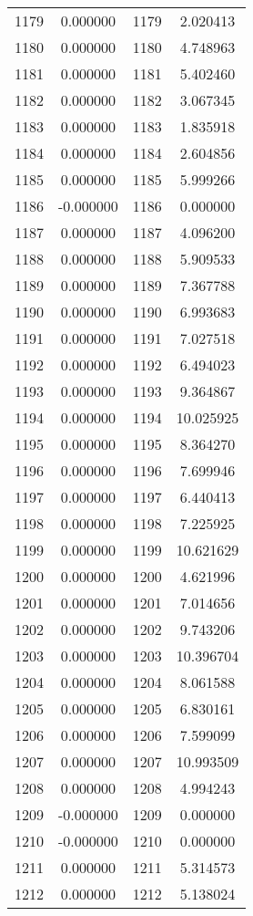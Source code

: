 \documentclass[12pt]{article}
\begin{document}
\begin{longtable}{@{}cccc@{}}
1179 & 0.000000 & 1179 & 2.020413 \\
1180 & 0.000000 & 1180 & 4.748963 \\
1181 & 0.000000 & 1181 & 5.402460 \\
1182 & 0.000000 & 1182 & 3.067345 \\
1183 & 0.000000 & 1183 & 1.835918 \\
1184 & 0.000000 & 1184 & 2.604856 \\
1185 & 0.000000 & 1185 & 5.999266 \\
1186 & -0.000000 & 1186 & 0.000000 \\
1187 & 0.000000 & 1187 & 4.096200 \\
1188 & 0.000000 & 1188 & 5.909533 \\
1189 & 0.000000 & 1189 & 7.367788 \\
1190 & 0.000000 & 1190 & 6.993683 \\
1191 & 0.000000 & 1191 & 7.027518 \\
1192 & 0.000000 & 1192 & 6.494023 \\
1193 & 0.000000 & 1193 & 9.364867 \\
1194 & 0.000000 & 1194 & 10.025925 \\
1195 & 0.000000 & 1195 & 8.364270 \\
1196 & 0.000000 & 1196 & 7.699946 \\
1197 & 0.000000 & 1197 & 6.440413 \\
1198 & 0.000000 & 1198 & 7.225925 \\
1199 & 0.000000 & 1199 & 10.621629 \\
1200 & 0.000000 & 1200 & 4.621996 \\
1201 & 0.000000 & 1201 & 7.014656 \\
1202 & 0.000000 & 1202 & 9.743206 \\
1203 & 0.000000 & 1203 & 10.396704 \\
1204 & 0.000000 & 1204 & 8.061588 \\
1205 & 0.000000 & 1205 & 6.830161 \\
1206 & 0.000000 & 1206 & 7.599099 \\
1207 & 0.000000 & 1207 & 10.993509 \\
1208 & 0.000000 & 1208 & 4.994243 \\
1209 & -0.000000 & 1209 & 0.000000 \\
1210 & -0.000000 & 1210 & 0.000000 \\
1211 & 0.000000 & 1211 & 5.314573 \\
1212 & 0.000000 & 1212 & 5.138024 \\

\end{longtable}
\end{document}
